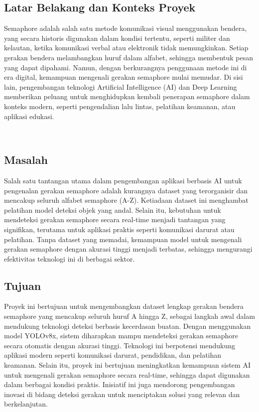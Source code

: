 \documentclass[12pt,a4paper]{article}
\begin{document}
\subsection{Latar Belakang dan Konteks Proyek}
\begin{adjustwidth}{3em}{0pt} 
\hspace{0.5cm} Semaphore adalah salah satu metode komunikasi visual menggunakan bendera, yang secara historis digunakan dalam kondisi tertentu, seperti militer dan kelautan, ketika komunikasi verbal atau elektronik tidak memungkinkan. Setiap gerakan bendera melambangkan huruf dalam alfabet, sehingga membentuk pesan yang dapat dipahami. Namun, dengan berkurangnya penggunaan metode ini di era digital, kemampuan mengenali gerakan semaphore mulai memudar. Di sisi lain, pengembangan teknologi Artificial Intelligence (AI) dan Deep Learning memberikan peluang untuk menghidupkan kembali penerapan semaphore dalam konteks modern, seperti pengendalian lalu lintas, pelatihan keamanan, atau aplikasi edukasi.\end{adjustwidth}
\

\subsection{Masalah}
\begin{adjustwidth}{3em}{0pt} 
\hspace{0.5cm} Salah satu tantangan utama dalam pengembangan aplikasi berbasis AI untuk pengenalan gerakan semaphore adalah kurangnya dataset yang terorganisir dan mencakup seluruh alfabet semaphore (A-Z). Ketiadaan dataset ini menghambat pelatihan model deteksi objek yang andal. Selain itu, kebutuhan untuk mendeteksi gerakan semaphore secara real-time menjadi tantangan yang signifikan, terutama untuk aplikasi praktis seperti komunikasi darurat atau pelatihan. Tanpa dataset yang memadai, kemampuan model untuk mengenali gerakan semaphore dengan akurasi tinggi menjadi terbatas, sehingga mengurangi efektivitas teknologi ini di berbagai sektor. \end{adjustwidth}

\subsection{Tujuan}
\begin{adjustwidth}{3em}{0pt} 
\hspace{0.5cm} Proyek ini bertujuan untuk mengembangkan dataset lengkap gerakan bendera semaphore yang mencakup seluruh huruf A hingga Z, sebagai langkah awal dalam mendukung teknologi deteksi berbasis kecerdasan buatan. Dengan menggunakan model YOLOv8x, sistem diharapkan mampu mendeteksi gerakan semaphore secara otomatis dengan akurasi tinggi. Teknologi ini berpotensi mendukung aplikasi modern seperti komunikasi darurat, pendidikan, dan pelatihan keamanan. Selain itu, proyek ini bertujuan meningkatkan kemampuan sistem AI untuk mengenali gerakan semaphore secara real-time, sehingga dapat digunakan dalam berbagai kondisi praktis. Inisiatif ini juga mendorong pengembangan inovasi di bidang deteksi gerakan untuk menciptakan solusi yang relevan dan berkelanjutan.
\end{adjustwidth}
\end{document}
